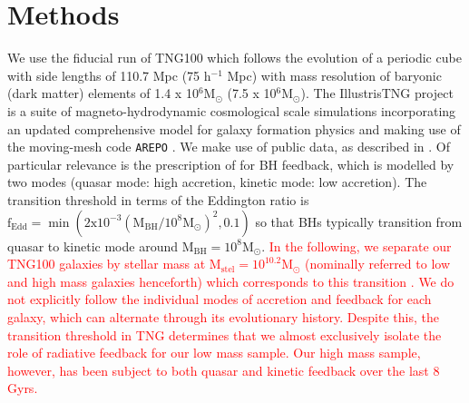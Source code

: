 \documentclass[fleqn,usenatbib]{mnras}
\newcommand{\red}[1]{{\textcolor{red}{#1}}}
\begin{document}
\section{Methods} \label{sec:methods}
We use the fiducial run of TNG100 which follows the evolution of a periodic cube with side lengths of 110.7 Mpc (75 h$^{-1}$ Mpc) with mass resolution of baryonic (dark matter) elements of 1.4 x 10$^6 \mathrm{M_{\odot}}$ (7.5 x 10$^6 \mathrm{M_{\odot}}$). The IllustrisTNG project \citep{marinacci18,naiman18,nelson18,pillepich18b,springel18} is a suite of magneto-hydrodynamic cosmological scale simulations incorporating an updated comprehensive model for galaxy formation physics \citep[][]{weinberger17,pillepich18a} and making use of the moving-mesh code \texttt{AREPO} \citep{springel10,pakmor11,pakmor13}. We make use of public data, as described in \citet{nelson2019}. Of particular relevance is the prescription of \citet{weinberger17} for BH feedback, which is modelled by two modes (quasar mode: high accretion, kinetic mode: low accretion). The transition threshold in terms of the Eddington ratio is $\mathrm{f_{Edd}= \min ( 2x10^{-3}(M_{BH}/10^8 M_{\odot})^2 , 0.1)}$ so that BHs typically transition from quasar to kinetic mode around $\mathrm{M_{BH} = 10^{8}M_{\odot}}$. \red{In the following, we separate our TNG100 galaxies by stellar mass at $\mathrm{M_{stel} = 10^{10.2}M_{\odot}}$ (nominally referred to low and high mass galaxies henceforth) which corresponds to this transition \citep[i.e. $\mathrm{M_{BH} \approx 10^{8}M_{\odot}}$, see Fig 1 in][]{li2019}. We do not explicitly follow the individual modes of accretion and feedback for each galaxy, which can alternate through its evolutionary history. Despite this, the transition threshold in TNG determines that we almost exclusively isolate the role of radiative feedback for our low mass sample. Our high mass sample, however, has been subject to both quasar and kinetic feedback over the last 8 Gyrs.}

\end{document}
